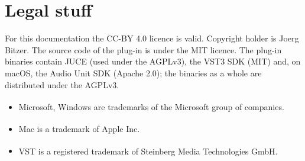 \documentclass[12pt]{article}
\newcommand{\pluginauthor}{Joerg Bitzer}
\begin{document}
\section{Legal stuff}
For this documentation the CC-BY 4.0 licence is valid. Copyright holder is \pluginauthor.
The source code of the plug-in is under the MIT licence. The plug-in binaries contain JUCE
(used under the AGPLv3), the VST3 SDK (MIT) and, on macOS, the Audio Unit SDK (Apache 2.0);
the binaries as a whole are distributed under the AGPLv3.

\begin{itemize}
    \item Microsoft\textsuperscript{\textregistered}, Windows\textsuperscript{\textregistered}
    are trademarks of the Microsoft group of companies.
    \item Mac\textsuperscript{\textregistered} is a trademark of Apple Inc.
    \item VST\textsuperscript{\textregistered} is a registered trademark of Steinberg Media
    Technologies GmbH.
\end{itemize}
\end{document}
